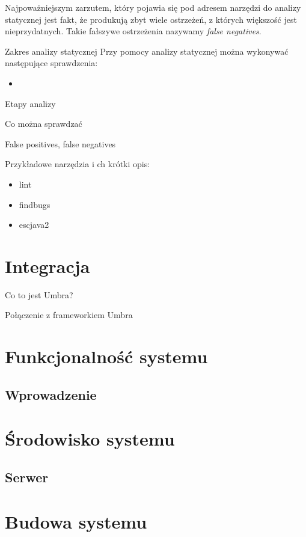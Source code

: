 \documentclass{pracamgr}
\begin{document}
    Najpoważniejszym zarzutem, który pojawia się pod adresem narzędzi do analizy statycznej jest fakt, że
    produkują zbyt wiele ostrzeżeń, z których większość jest nieprzydatnych. Takie fałszywe ostrzeżenia nazywamy
    \textit{false negatives}.
    
    Zakres analizy statycznej
    Przy pomocy analizy statycznej można wykonywać następujące sprawdzenia:
    \begin{itemize}
        \item 
    \end{itemize}
    
    Etapy analizy
    
    Co można sprawdzać
    
    False positives, false negatives
    
    Przykładowe narzędzia i ch krótki opis:
    \begin{itemize}
        \item lint
        \item findbugs
        \item escjava2
    \end{itemize}
    
    
\chapter{Integracja}\label{r:integration}

    Co to jest Umbra?

    Połączenie z frameworkiem Umbra

\chapter{Funkcjonalność systemu}\label{r:funkcjonalnosc}

\section{Wprowadzenie}


\chapter{Środowisko systemu}\label{r:srodowisko}

\section{Serwer}


\chapter{Budowa systemu}\label{r:budowa}
\end{document}

